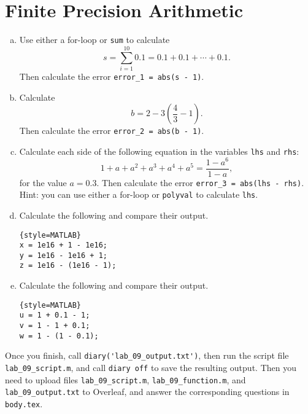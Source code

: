 \section{Finite Precision Arithmetic}
\begin{enumerate}[(a)]
    \item Use either a for-loop or \verb|sum| to calculate
            $$
            s = \sum_{i=1}^{10} 0.1 = 0.1 + 0.1 + \cdots + 0.1.
            $$
            Then calculate the error \verb|error_1 = abs(s - 1)|.
    \item Calculate
            $$
            b = 2 - 3 \left(\frac{4}{3} - 1\right).
            $$
            Then calculate the error \verb|error_2 = abs(b - 1)|.
    \item Calculate each side of the following equation in the variables \verb|lhs| and \verb|rhs|:
            $$
            1 + a + a^2 + a^3 + a^4 + a^5 = \frac{1 - a^6}{1 - a},
            $$
            for the value $a = 0.3$. Then calculate the error \verb|error_3 = abs(lhs - rhs)|. Hint: you can use either a for-loop or \verb`polyval` to calculate \verb|lhs|.
    \item Calculate the following and compare their output.
            \begin{lstlisting}{style=MATLAB}
x = 1e16 + 1 - 1e16;
y = 1e16 - 1e16 + 1;
z = 1e16 - (1e16 - 1);
            \end{lstlisting}
    \item Calculate the following and compare their output.
            \begin{lstlisting}{style=MATLAB}
u = 1 + 0.1 - 1;
v = 1 - 1 + 0.1;
w = 1 - (1 - 0.1);
            \end{lstlisting}
\end{enumerate}

Once you finish, call \verb|diary('lab_09_output.txt')|, then run the script file \verb|lab_09_script.m|, and call \verb|diary off| to save the resulting output. Then you need to upload files \verb|lab_09_script.m|, \verb|lab_09_function.m|, and \verb|lab_09_output.txt| to Overleaf, and answer the corresponding questions in \verb|body.tex|.
